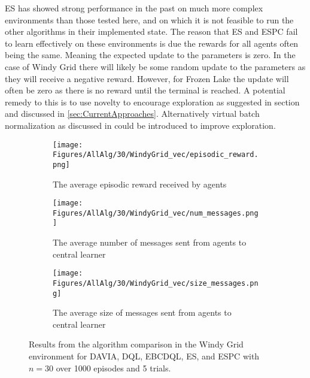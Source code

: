 ES has showed strong performance in the past on much more complex environments than those tested here, and on which it is not feasible to run the other algorithms in their implemented state. The reason that ES and ESPC fail to learn effectively on these environments is due the rewards for all agents often being the same. Meaning the expected update to the parameters is zero. In the case of Windy Grid there will likely be some random update to the parameters as they will receive a negative reward. However, for Frozen Lake the update will often be zero as there is no reward until the terminal is reached.
A potential remedy to this is to use novelty to encourage exploration as suggested in section \cite{NS-ES} and discussed in \ref{sec:CurrentApproaches}.
Alternatively virtual batch normalization as discussed in \cite{VBN} could be introduced to improve exploration.

\begin{figure}[H]
    \centering
    \begin{subfigure}{0.5\textwidth}
        \centering
        \texttt{[image: Figures/AllAlg/30/WindyGrid\_vec/episodic\_reward.png]}
        \caption{The average episodic reward received by agents}
        \label{fig:AlgsWGReward}
    \end{subfigure}
    \begin{subfigure}{0.5\textwidth}
        \centering
        \texttt{[image: Figures/AllAlg/30/WindyGrid\_vec/num\_messages.png]}
        \caption{The average number of messages sent from agents to central learner}
        \label{fig:AlgsWGNumMessages}
    \end{subfigure}
    \begin{subfigure}{0.5\textwidth}
        \centering
        \texttt{[image: Figures/AllAlg/30/WindyGrid\_vec/size\_messages.png]}
        \caption{The average size of messages sent from agents to central learner}
        \label{fig:AlgsWGSizeMessages}
    \end{subfigure}
    \caption{Results from the algorithm comparison in the Windy Grid environment for DAVIA, DQL, EBCDQL, ES, and ESPC with $n=30$ over 1000 episodes and 5 trials.}
    \label{fig:AlgsWG}
\end{figure}

